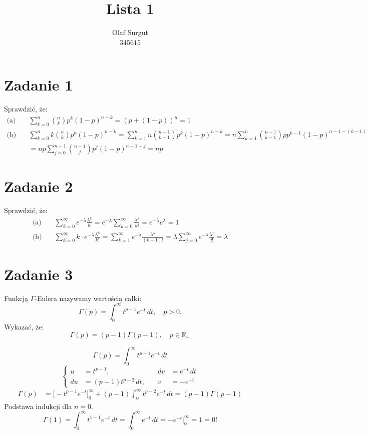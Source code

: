 \documentclass[11pt]{article}
\title{\vspace*{-0.75in}\textbf{Lista 1}}
\author{Olaf Surgut \\ $345615$}
\begin{document}
\pagestyle{empty}
\maketitle
\thispagestyle{empty}

\section*{Zadanie 1}

Sprawdzić, że:
\begin{align*}
\text{(a)}\quad& \sum_{k = 0}^{n} \binom{n}{k} p^k (1-p)^{n-k} = (p + (1 - p))^n = 1 \\
\text{(b)}\quad& \sum_{k = 0}^{n} k \binom{n}{k} p^k (1-p)^{n-k} 
    = \sum_{k = 1}^{n} n \binom{n - 1}{k - 1} p^k (1-p)^{n-k}
    = n \sum_{k = 1}^{n} \binom{n - 1}{k - 1} p p^{k-1} (1-p)^{n-1-(k-1)} \\
    &= np \sum_{j = 0}^{n-1} \binom{n-1}{j} p^j (1-p)^{n-1-j} = np
\end{align*}


\section*{Zadanie 2}

Sprawdzić, że:
\begin{align*}
\text{(a)}\quad& \sum_{k=0}^{\infty} e^{-\lambda}\frac{\lambda^k}{k!} 
       = e^{-\lambda} \sum_{k=0}^{\infty} \frac{\lambda^k}{k!} 
      = e^{-\lambda} e^{\lambda} = 1 \\
\text{(b)}\quad& \sum_{k=0}^{\infty} k \cdot e^{-\lambda} \frac{\lambda^k}{k!}
      = \sum_{k=1}^{\infty} e^{-\lambda}\frac{\lambda^k}{(k-1)!}
      = \lambda \sum_{j=0}^{\infty} e^{-\lambda}\frac{\lambda^j}{j!}
      = \lambda
\end{align*}

\section*{Zadanie 3}

Funkcją $\Gamma$-Eulera nazywamy wartością całki:
\[
\Gamma(p) = \int_{0}^{\infty} t^{p-1}e^{-t}\, dt, \quad p > 0.
\]
Wykazać, że:
\[ \Gamma(p) = (p-1)\Gamma(p-1), \quad p \in \mathbb{R_{+}} \]

\[ \Gamma(p) = \int_{0}^{\infty} t^{p-1}e^{-t}\, dt \]
\[ 
\left\{
\begin{aligned}
u &= t^{p-1}, \qquad &dv&= e^{-t}\,dt\\ 
du &= (p-1)t^{p-2}\,dt, \quad &v& =-e^{-t} 
\end{aligned}
\right.
\]
\begin{align*}
\Gamma(p)
&= \Big[-t^{p-1}e^{-t}\Big]_{0}^{\infty} + (p-1)\int_{0}^{\infty} t^{p-2} e^{-t}\,dt 
= (p-1)\Gamma(p-1) 
\end{align*}
Podstawa indukcji dla $n = 0$.
\[
\Gamma(1)=\int_{0}^{\infty} t^{1-1}e^{-t}\, dt = \int_{0}^{\infty} e^{-t}\,dt = -e^{-t}\Big|_{0}^{\infty}=1=0!
\]
\end{document}
